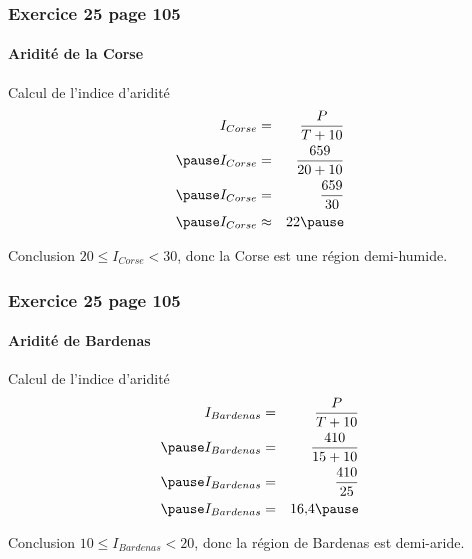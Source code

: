 \documentclass[xcolor={dvipsnames}]{beamer}
\begin{document}
\begin{frame}
	\frametitle{Exercice 25 page 105}
	\framesubtitle{Aridité de la Corse}
	
	\begin{block}{Calcul de l'indice d'aridité}
		\begin{eqnarray*}
			I_{Corse} &=& \dfrac{P}{T + 10} \\ \pause
			I_{Corse} &=& \dfrac{\num{659}}{20 + 10} \\ \pause
			I_{Corse} &=& \dfrac{\num{659}}{30} \\ \pause
			I_{Corse} &\approx& \num{22} \pause			
		\end{eqnarray*}
		
		
	\end{block}
	
	\begin{alertblock}{Conclusion}
		$20 \le I_{Corse} < 30$, donc la Corse est une région demi-humide.
	\end{alertblock}
\end{frame}


\begin{frame}
	\frametitle{Exercice 25 page 105}
	\framesubtitle{Aridité de Bardenas}
	
	\begin{block}{Calcul de l'indice d'aridité}
		\begin{eqnarray*}
			I_{Bardenas} &=& \dfrac{P}{T + 10} \\ \pause
			I_{Bardenas} &=& \dfrac{\num{410}}{15 + 10} \\ \pause
			I_{Bardenas} &=& \dfrac{\num{410}}{25} \\ \pause
			I_{Bardenas} &=& \num{16.4} \pause			
		\end{eqnarray*}
		
		
	\end{block}
	
	\begin{alertblock}{Conclusion}
		$10 \le I_{Bardenas} < 20$, donc la région de Bardenas est demi-aride.
	\end{alertblock}
\end{frame}
\end{document}
